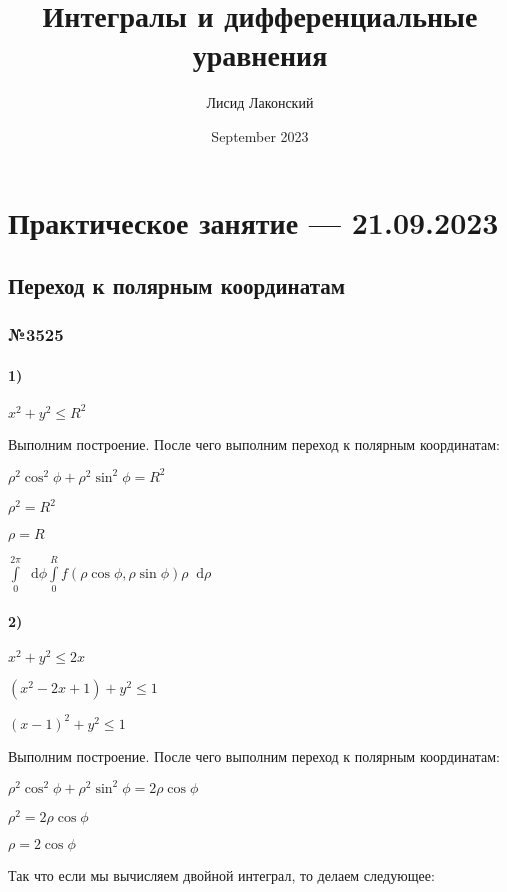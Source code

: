 \documentclass{article}
\title{Интегралы и дифференциальные уравнения}
\author{Лисид Лаконский}
\date{September 2023}
\newcommand*\diff{\mathop{}\!\mathrm{d}}
\begin{document}
\raggedright

\maketitle

\tableofcontents
\pagebreak

\section{Практическое занятие — 21.09.2023}

\subsection{Переход к полярным координатам}

\subsubsection{№3525}

\paragraph{1)} $x^2 + y^2 \le R^2$

Выполним построение. После чего выполним переход к полярным координатам:

$\rho^2 \cos^2 \phi + \rho^2 \sin^2 \phi =  R^2$

$\rho^2 = R^2$

$\rho = R$

$\int\limits_{0}^{2 \pi} \diff \phi \int\limits_{0}^{R} f(\rho \cos \phi, \rho \sin \phi) \rho \diff \rho$

\paragraph{2)}

$x^2+y^2 \le 2x$

$(x^2-2x+1) + y^2 \le 1$

$(x-1)^2 + y^2 \le 1$

Выполним построение. После чего выполним переход к полярным координатам:

$\rho^2 \cos^2 \phi + \rho^2 \sin^2 \phi = 2 \rho \cos \phi$

$\rho^2 = 2 \rho \cos \phi$

$\rho = 2 \cos \phi$

Так что если мы вычисляем двойной интеграл, то делаем следующее:
\end{document}
